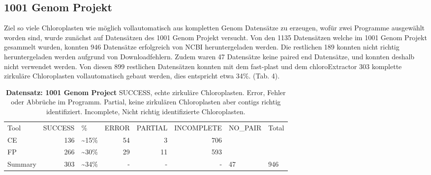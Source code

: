 \documentclass{scrartcl}
\begin{document}
\subsection{1001 Genom Projekt}
\label{sec-4-6}
Ziel so viele Chloroplasten wie möglich vollautomatisch aus kompletten Genom Datensätze zu erzeugen, wofür zwei Programme ausgewählt worden sind, wurde zunächst auf Datensätzen 
des 1001 Genom Projekt versucht.
Von den 1135 Datensätzen welche im 1001 Genom Projekt gesammelt wurden, konnten 946 Datensätze erfolgreich von NCBI heruntergeladen werden. Die restlichen 189 konnten nicht richtig heruntergeladen werden aufgrund von Downloadfehlern. 
Zudem waren 47 Datensätze keine paired end Datensätze, und konnten deshalb nicht verwendet werden. Von diesen 899 restlichen Datensätzen konnten mit dem fast-plast und dem chloroExtractor 303 komplette zirkuläre Chloroplasten 
vollautomatisch gebaut werden, dies entspricht etwa 34\%. (Tab. 4). 
\begin{table}[!h]
\caption[Datensatz: 1001 Genom Project]{\textbf{Datensatz: 1001 Genom Project} SUCCESS, echte zirkuläre Chloroplasten. Error, Fehler oder Abbrüche im Programm. Partial, keine zirkulären Chloroplasten aber contigs richtig identifiziert. Incomplete, Nicht richtig identifizierte Chloroplasten.}
\begin{center}
\begin{tabular}{lrlrrrll}
Tool & SUCCESS & \% & ERROR & PARTIAL & INCOMPLETE & NO\_PAIR & Total\\
CE & 136 & \textasciitilde{}15\% & 54 & 3 & 706 &  & \\
FP & 266 & \textasciitilde{}30\% & 29 & 11 & 593 &  & \\
Summary & 303 & \textasciitilde{}34\% & - & - & - & 47 & 946\\
\end{tabular}
\end{center}
\end{table}
\end{document}
